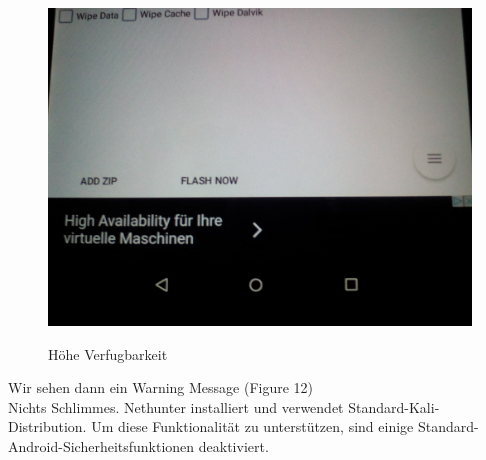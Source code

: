 \documentclass[11pt,a4paper]{article}
\begin{document}
\begin{figure}[H]
\begin{center} \includegraphics[scale=0.1]{./Image/img11}  \\
\caption{Höhe Verfugbarkeit}
\end{center}
\end{figure} 

Wir sehen dann ein Warning Message (Figure 12)\\
Nichts Schlimmes.
Nethunter installiert und verwendet Standard-Kali-Distribution. Um diese Funktionalität zu unterstützen, sind einige Standard-Android-Sicherheitsfunktionen deaktiviert. \\
\end{document}
